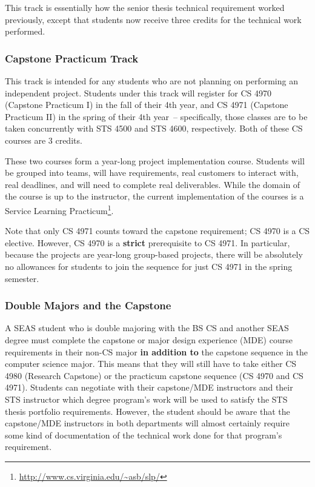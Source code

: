 \documentclass[10pt,letter,twocolumn]{book}
\newcommand{\myurl}[1]{\footnote{\scriptsize\url{#1}}}
\begin{document}
This track is essentially how the senior thesis technical requirement
worked previously, except that students now receive three credits for
the technical work performed.

\subsubsection{Capstone Practicum Track}

This track is intended for any students who are not planning on
performing an independent project.  Students under this track will
register for CS 4970 (Capstone Practicum I) in the fall of their 4th
year, and CS 4971 (Capstone Practicum II) in the spring of their 4th
year~-- specifically, those classes are to be taken concurrently with
STS 4500 and STS 4600, respectively.  Both of these CS courses are 3
credits.

These two courses form a year-long project implementation course.
Students will be grouped into teams, will have requirements, real
customers to interact with, real deadlines, and will need to complete
real deliverables.  While the domain of the course is up to the
instructor, the current implementation of the courses is a Service
Learning Practicum\myurl{http://www.cs.virginia.edu/~asb/slp/}.

Note that only CS 4971 counts toward the capstone requirement; CS 4970
is a CS elective.  However, CS 4970 is a {\bf strict} prerequisite to
CS 4971.  In particular, because the projects are year-long
group-based projects, there will be absolutely no allowances for
students to join the sequence for just CS 4971 in the spring semester.


\subsubsection{Double Majors and the Capstone}

A SEAS student who is double majoring with the BS CS and another SEAS
degree must complete the capstone or major design experience (MDE)
course requirements in their non-CS major {\bf in addition to} the
capstone sequence in the computer science major.  This means that they
will still have to take either CS 4980 (Research Capstone) or the
practicum capstone sequence (CS 4970 and CS 4971). Students can
negotiate with their capstone/MDE instructors and their STS instructor
which degree program's work will be used to satisfy the STS thesis
portfolio requirements. However, the student should be aware that the
capstone/MDE instructors in both departments will almost certainly
require some kind of documentation of the technical work done for that
program's requirement.
\end{document}
